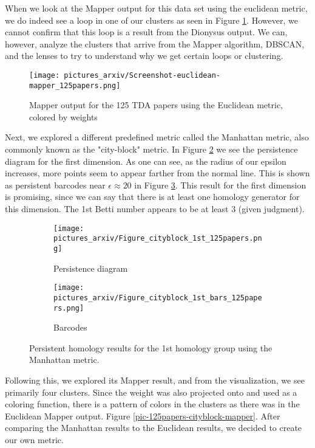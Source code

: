 \documentclass[12pt]{article}
\theoremstyle{definition}
\begin{document}
\par When we look at the Mapper output for this data set using the euclidean metric, we do indeed see a loop in one of our clusters as seen in Figure \ref{pic-125papers-euclidean-mapper}. However, we cannot confirm that this loop is a result from the Dionysus output. We can, however, analyze the clusters that arrive from the Mapper algorithm, DBSCAN, and the lenses to try to understand why we get certain loops or clustering. 

\begin{figure}[H]
\texttt{[image: pictures\_arxiv/Screenshot-euclidean-mapper\_125papers.png]}
\caption{Mapper output for the 125 TDA papers using the Euclidean metric, colored by weights}
\label{pic-125papers-euclidean-mapper}
\end{figure}

\par Next, we explored a different predefined metric called the Manhattan metric, also commonly known as the "city-block" metric. In Figure \ref{pic-125papers-cityblock} we see the persistence diagram for the first dimension. As one can see, as the radius of our epsilon increases, more points seem to appear farther from the normal line. This is shown as persistent barcodes near $\epsilon\approx 20$ in Figure \ref{pic-125papers-cityblock-bars}. This result for the first dimension is promising, since we can say that there is at least one homology generator for this dimension. The 1st Betti number appears to be at least 3 (given judgment). 

\begin{figure}[h]
\begin{subfigure}{.5\textwidth}
  \centering
  \texttt{[image: pictures\_arxiv/Figure\_cityblock\_1st\_125papers.png]} 
  \caption{Persistence diagram}
  \label{pic-125papers-cityblock} 
\end{subfigure}%
\begin{subfigure}{.5\textwidth}
  \centering
  \texttt{[image: pictures\_arxiv/Figure\_cityblock\_1st\_bars\_125papers.png]}
  \caption{Barcodes}
  \label{pic-125papers-cityblock-bars}
\end{subfigure}
\caption{Persistent homology results for the 1st homology group using the Manhattan metric.}
\label{fig-125papers-cityblock}
\end{figure}

\par Following this, we explored its Mapper result, and from the visualization, we see primarily four clusters. Since the weight was also projected onto and used as a coloring function, there is a pattern of colors in the clusters as there was in the Euclidean Mapper output. Figure \ref{pic-125papers-cityblock-mapper}. After comparing the Manhattan results to the Euclidean results, we decided to create our own metric.   
\end{document}
